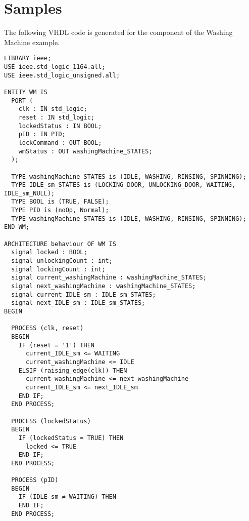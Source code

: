 \section{Samples}
\label{sec:vhdl-samples}

The following VHDL code is generated for the  component of the Washing Machine example.

\begin{verbatim}
LIBRARY ieee;
USE ieee.std_logic_1164.all;
USE ieee.std_logic_unsigned.all;

ENTITY WM IS
  PORT (
    clk : IN std_logic;
    reset : IN std_logic;
    lockedStatus : IN BOOL;
    pID : IN PID;
    lockCommand : OUT BOOL;
    wmStatus : OUT washingMachine_STATES;
  );

  TYPE washingMachine_STATES is (IDLE, WASHING, RINSING, SPINNING);
  TYPE IDLE_sm_STATES is (LOCKING_DOOR, UNLOCKING_DOOR, WAITING, IDLE_sm_NULL);
  TYPE BOOL is (TRUE, FALSE);
  TYPE PID is (noOp, Normal);
  TYPE washingMachine_STATES is (IDLE, WASHING, RINSING, SPINNING);
END WM;

ARCHITECTURE behaviour OF WM IS
  signal locked : BOOL;
  signal unlockingCount : int;
  signal lockingCount : int;
  signal current_washingMachine : washingMachine_STATES;
  signal next_washingMachine : washingMachine_STATES;
  signal current_IDLE_sm : IDLE_sm_STATES;
  signal next_IDLE_sm : IDLE_sm_STATES;
BEGIN

  PROCESS (clk, reset)
  BEGIN
    IF (reset = '1') THEN
      current_IDLE_sm <= WAITING
      current_washingMachine <= IDLE
    ELSIF (raising_edge(clk)) THEN
      current_washingMachine <= next_washingMachine
      current_IDLE_sm <= next_IDLE_sm
    END IF;
  END PROCESS;

  PROCESS (lockedStatus)
  BEGIN
    IF (lockedStatus = TRUE) THEN
      locked <= TRUE
    END IF;
  END PROCESS;

  PROCESS (pID)
  BEGIN
    IF (IDLE_sm ≠ WAITING) THEN
    END IF;
  END PROCESS;


\end{verbatim}
